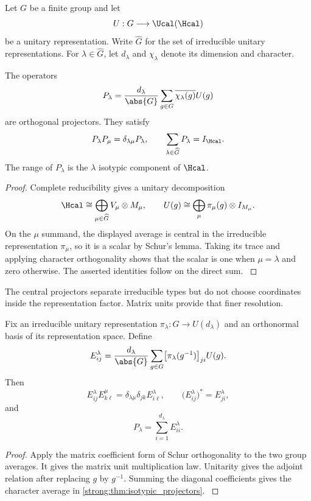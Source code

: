 Let \(G\) be a finite group and let
\[
U:G\longrightarrow\Ucal(\Hcal)
\]
be a unitary representation. Write \(\widehat G\) for the set of irreducible unitary representations. For \(\lambda\in\widehat G\), let \(d_\lambda\) and \(\chi_\lambda\) denote its dimension and character.

\begin{theorem}\label{strong:theorem:003}\label{strong:thm:isotypic_projectors}
The operators
\[
P_\lambda
=
\frac{d_\lambda}{\abs{G}}
\sum_{g\in G}
\overline{\chi_\lambda(g)}U(g)
\]
are orthogonal projectors. They satisfy
\[
P_\lambda P_\mu=\delta_{\lambda\mu}P_\lambda,
\qquad
\sum_{\lambda\in\widehat G}P_\lambda=I_{\Hcal}.
\]
The range of \(P_\lambda\) is the \(\lambda\) isotypic component of \(\Hcal\).
\end{theorem}

\begin{proof}\label{strong:proof:005}
Complete reducibility gives a unitary decomposition
\[
\Hcal
\cong
\bigoplus_{\mu\in\widehat G}
V_\mu\otimes M_\mu,
\qquad
U(g)
\cong
\bigoplus_\mu
\pi_\mu(g)\otimes I_{M_\mu}.
\]
On the \(\mu\) summand, the displayed average is central in the irreducible representation \(\pi_\mu\), so it is a scalar by Schur's lemma. Taking its trace and applying character orthogonality shows that the scalar is one when \(\mu=\lambda\) and zero otherwise. The asserted identities follow on the direct sum.
\label{strong:proof:005:end}\end{proof}

The central projectors separate irreducible types but do not choose coordinates inside the representation factor. Matrix units provide that finer resolution.

\begin{theorem}\label{strong:theorem:004}\label{strong:thm:representation_matrix_units}
Fix an irreducible unitary representation \(\pi_\lambda:G\to U(d_\lambda)\) and an orthonormal basis of its representation space. Define
\[
E_{ij}^{\lambda}
=
\frac{d_\lambda}{\abs{G}}
\sum_{g\in G}
\bigl[\pi_\lambda(g^{-1})\bigr]_{ji}U(g).
\]
Then
\[
E_{ij}^{\lambda}E_{k\ell}^{\mu}
=
\delta_{\lambda\mu}\delta_{jk}E_{i\ell}^{\lambda},
\qquad
\bigl(E_{ij}^{\lambda}\bigr)^*=E_{ji}^{\lambda},
\]
and
\[
P_\lambda=\sum_{i=1}^{d_\lambda}E_{ii}^{\lambda}.
\]
\end{theorem}

\begin{proof}\label{strong:proof:006}
Apply the matrix coefficient form of Schur orthogonality to the two group averages. It gives the matrix unit multiplication law. Unitarity gives the adjoint relation after replacing \(g\) by \(g^{-1}\). Summing the diagonal coefficients gives the character average in \cref{strong:thm:isotypic_projectors}.
\label{strong:proof:006:end}\end{proof}

